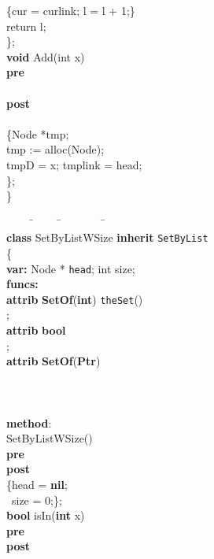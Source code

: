 \documentclass[fleqn]{llncs}
\begin{document}
\begin{figure}
\begin{center}
\begin{boxedminipage}{0.5\textwidth}
{\begin{tabbing}
    \>  \>\{cur = cur\fldacc link; l = l + 1;\}\\
    \>  \>return l;\\
    \>\};\\
    \>\textbf{void} Add(int x)\\
    \>  \>\textbf{pre} \\
    \>  \>  \>\\
    \>  \>\textbf{post} \\
    \>  \>  \>\\
    \>\{\>Node *tmp;\\
    \>  \>tmp := alloc(Node); \\
    \>  \>tmp\fldacc D = x; tmp\fldacc link = head;\\
    \>\};\\
\}
\end{tabbing}
}
\end{boxedminipage}
\begin{boxedminipage}{0.5\textwidth}
{\scriptsize
\begin{tabbing}
\ \ \ \ \=\ \ \ \ \ \=\ \ \ \ \ \ \ \ \=\ \ \ \ \=\\
\textbf{class} SetByListWSize \textbf{inherit} \texttt{SetByList}\\
\{\\
\textbf{var:} Node * \texttt{head};  int size;\\
\textbf{funcs:}\\
    \>\textbf{attrib} \textbf{SetOf}(\textbf{int}) \texttt{theSet}()  \\
    \>  \>;\\
    \>\textbf{attrib} \textbf{bool} \\
    \>  \>;\\
    \>\textbf{attrib} \textbf{SetOf}(\textbf{Ptr}) \\
    \>  \>\\
    \>  \>\\
    \>  \>\\
\textbf{method}:\\
    \>SetByListWSize()\\
    \>  \>\textbf{pre}  \\
    \>  \>\textbf{post} \\
    \>  \>\{head = \textbf{nil};\\
    \>  \>\ size = 0;\};\\
    \>\textbf{bool}  isIn(\textbf{int} x)\\
    \>  \>\textbf{pre} \\
    \>  \>\textbf{post} \\

\end{tabbing}}
\end{boxedminipage}
\end{center}
\end{figure}
\end{document}
